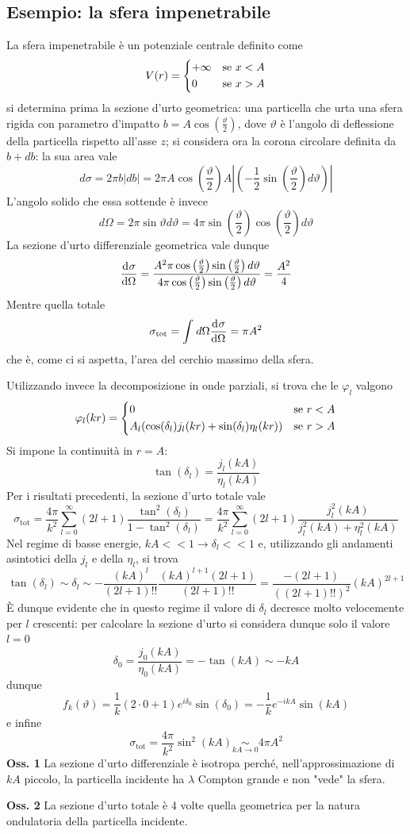 \subsection{Esempio: la sfera impenetrabile}
La sfera impenetrabile è un potenziale centrale definito come
$$V(r)=\begin{dcases}
    +\infty &\text{se }x<A\\
    0 &\text{se }x>A
\end{dcases}
$$
si determina prima la sezione d'urto geometrica: una particella che urta una sfera rigida con
parametro d'impatto $b = A\cos\left(\frac{\vartheta}{2}\right)$, dove $\vartheta$ è l'angolo di
deflessione della particella rispetto all'asse $z$; si considera ora la corona circolare definita da
$b+db$: la sua area vale
$$d\sigma = 2\pi b|db| = 2\pi A\cos\left(\frac{\vartheta}{2}\right)A\left|\left(
-\frac{1}{2}\sin\left(\frac{\vartheta}{2}\right)d\vartheta\right)\right|$$
L'angolo solido che essa sottende è invece
$$d\Omega = 2\pi\sin\vartheta d\vartheta = 4\pi\sin\left(\frac{\vartheta}{2}\right)
\cos\left(\frac{\vartheta}{2}\right)d\vartheta$$
La sezione d'urto differenziale geometrica vale dunque
$$\dv[]{\sigma}{\Omega} = \frac{A^2\pi\cos\left(\frac{\vartheta}{2}\right)
\sin\left(\frac{\vartheta}{2}\right)d\vartheta}{4\pi\cos\left(\frac{\vartheta}{2}\right)
\sin\left(\frac{\vartheta}{2}\right)d\vartheta} = \frac{A^2}{4}$$
Mentre quella totale
$$\sigma_\text{tot} = \int_{}^{}d\Omega\dv[]{\sigma}{\Omega} = \pi A^2$$
che è, come ci si aspetta, l'area del cerchio massimo della sfera.

Utilizzando invece la decomposizione in onde parziali, si trova che le $\varphi_l$ valgono
$$\varphi_l(kr) = \begin{dcases}
    0 &\text{se } r<A\\
    A_l(\cos(\delta_l)j_l(kr) + \sin(\delta_l)\eta_l(kr)) &\text{se }r>A
\end{dcases}
$$
Si impone la continuità in $r=A$:
$$\tan(\delta_l) = \frac{j_l(kA)}{\eta_l(kA)}$$
Per i risultati precedenti, la sezione d'urto totale vale
$$\sigma_\text{tot} = \frac{4\pi}{k^2}\sum_{l=0}^{\infty}(2l+1)\frac{\tan^2(\delta_l)}
{1-\tan^2(\delta_l)}=\frac{4\pi}{k^2}\sum_{l=0}^{\infty}(2l+1)\frac{j^2_l(kA)}{j_l^2(kA)+\eta_l^2(kA)}
$$
Nel regime di basse energie, $kA<<1\rightarrow\delta_l<<1$ e, utilizzando gli andamenti asintotici
della $j_l$ e della $\eta_l$, si trova
$$\tan(\delta_l)\sim\delta_l \sim -\frac{(kA)^l}{(2l+1)!!}\frac{(kA)^{l+1}(2l+1)}{(2l+1)!!} = 
\frac{-(2l+1)}{((2l+1)!!)^2}(kA)^{2l+1}
$$
È dunque evidente che in questo regime il valore di $\delta_l$ decresce molto velocemente per $l$
crescenti: per calcolare la sezione d'urto si considera dunque solo il valore $l=0$
$$\delta_0 = \frac{j_0(kA)}{\eta_0(kA)} = -\tan(kA)\sim-kA$$
dunque
$$f_k(\vartheta) = \frac{1}{k}(2\cdot0+1)e^{i\delta_0}\sin(\delta_0) = -\frac{1}{k}e^{-ikA}\sin(kA)$$
e infine
$$\sigma_\text{tot} = \frac{4\pi}{k^2}\sin^2(kA)\underset{kA\to0}\sim 4\pi A^2$$
\textbf{Oss. 1} La sezione d'urto differenziale è isotropa perché, nell'approssimazione di
$kA$ piccolo, la particella incidente ha $\lambda$ Compton grande e non "vede" la sfera.

\textbf{Oss. 2} La sezione d'urto totale è 4 volte quella geometrica per la natura ondulatoria
della particella incidente.
\newpage
